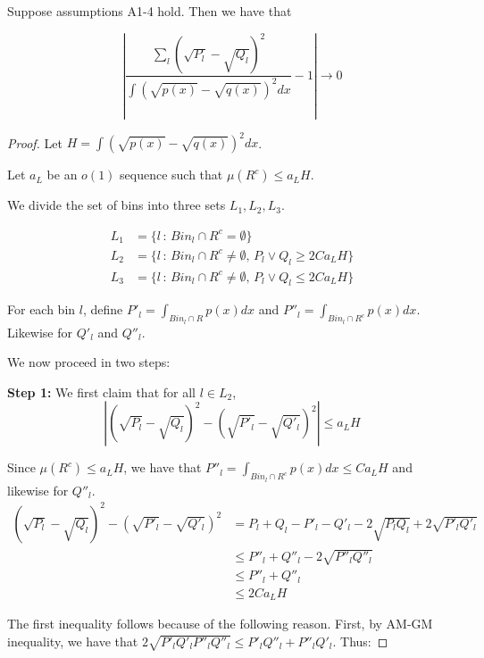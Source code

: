 \begin{proposition}
\label{prop:H_HL_convergence1}
Suppose assumptions A1-4 hold. Then we have that

\[
\left| \frac{
         \sum_l (\sqrt{P_l} - \sqrt{Q_l})^2 }{ \int (\sqrt{p(x)} - \sqrt{q(x)})^2 dx} - 1 \right| \rightarrow 0
\] 



\end{proposition}


\begin{proof}
Let $H = \int (\sqrt{p(x)} - \sqrt{q(x)})^2 dx$. 

Let $a_L$ be an $o(1)$ sequence such that $\mu(R^c) \leq a_L H $. 

We divide the set of bins into three sets $L_1, L_2, L_3$. 

\begin{align*}
L_1 &= \{ l\,:\, Bin_l \cap R^c = \emptyset \} \\
L_2 &= \{ l \,:\, Bin_l \cap R^c \neq \emptyset, \, P_l \vee Q_l \geq 2C a_L H \} \\
L_3 &= \{ l \,:\, Bin_l \cap R^c \neq \emptyset, \, P_l \vee Q_l \leq 2C a_L H \}
\end{align*}

For each bin $l$, define $P'_l = \int_{Bin_l \cap R} p(x) dx$ and $P''_l = \int_{Bin_l \cap R^c} p(x) dx$. Likewise for $Q'_l$ and $Q''_l$. 

We now proceed in two steps:

\textbf{Step 1:} We first claim that for all $l \in L_2$, 
\[
\left| (\sqrt{P_l} - \sqrt{Q_l})^2 - (\sqrt{P'_l} - \sqrt{Q'_l})^2 \right| \leq a_L H
\]



Since $\mu(R^c) \leq a_L H$, we have that $P''_l = \int_{Bin_l \cap R^c} p(x) dx \leq C a_L H $ and likewise for $Q''_l$. 
\begin{align*}
(\sqrt{P_l} - \sqrt{Q_l})^2 - (\sqrt{P'_l} - \sqrt{Q'_l})^2 &=
   P_l + Q_l - P'_l - Q'_l - 2 \sqrt{P_l Q_l} + 2 \sqrt{P'_l Q'_l} \\
  &\leq P''_l + Q''_l - 2 \sqrt{P''_l Q''_l} \\
  &\leq P''_l + Q''_l \\
  &\leq 2 C a_L H
\end{align*}

The first inequality follows because of the following reason. First, by AM-GM inequality, we have that $2 \sqrt{P'_l Q'_l P''_l Q''_l} \leq P'_l Q''_l + P''_l Q'_l$. Thus:


\end{proof}
